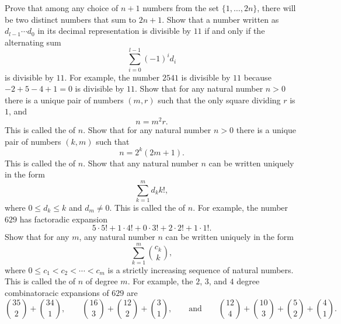 \begin{routine}
  \exercise Prove that among any choice of $n+1$ numbers from the set $\{1,\ldots, 2n\}$, there will be two distinct numbers that sum to $2n+1$.
  \exercise Show that a number written as $d_{l-1}\cdots d_0$ in its decimal representation is divisible by $11$ if and only if the alternating sum
  \begin{equation*}
    \sum_{i=0}^{l-1}(-1)^{i}d_i
  \end{equation*}
  is divisible by $11$. For example, the number $2541$ is divisible by $11$ because $-2+5-4+1=0$ is divisible by $11$.
  \exercise Show that for any natural number $n>0$ there is a unique pair of numbers $(m,r)$ such that the only square dividing $r$ is $1$, and
  \begin{equation*}
    n = m^2r.
  \end{equation*}
  This is called the  of $n$.
  \exercise Show that for any natural number $n>0$ there is a unique pair of numbers $(k,m)$ such that
  \begin{equation*}
    n = 2^k(2m+1).
  \end{equation*}
  This is called the  of $n$.
  \exercise Show that any natural number $n$ can be written uniquely in the form
  \begin{equation*}
    \sum_{k=1}^m d_k k!,
  \end{equation*}
  where $0\leq d_k\leq k$ and $d_m\neq 0$. This is called the  of $n$. For example, the number $629$ has factoradic expansion
  \begin{equation*}
    5\cdot 5! + 1\cdot 4!+ 0\cdot 3!+ 2\cdot 2! + 1\cdot 1!.
  \end{equation*}
  \exercise Show that for any $m$, any natural number $n$ can be written uniquely in the form
  \begin{equation*}
    \sum_{k=1}^m \binom{c_k}{k},
  \end{equation*}
  where $0\leq c_1<c_2<\cdots <c_m$ is a strictly increasing sequence of natural numbers. This is called the  of $n$ of degree $m$. For example, the $2$\supnd{}, $3$\suprd{}, and $4$\supth{} degree combinatoracic expansions of $629$ are
  \begin{equation*}
    \binom{35}{2}+\binom{34}{1},\qquad \binom{16}{3}+\binom{12}{2}+\binom{3}{1},\qquad\text{and}\qquad \binom{12}{4}+\binom{10}{3}+\binom{5}{2}+\binom{4}{1}.
  \end{equation*}
\end{routine}


